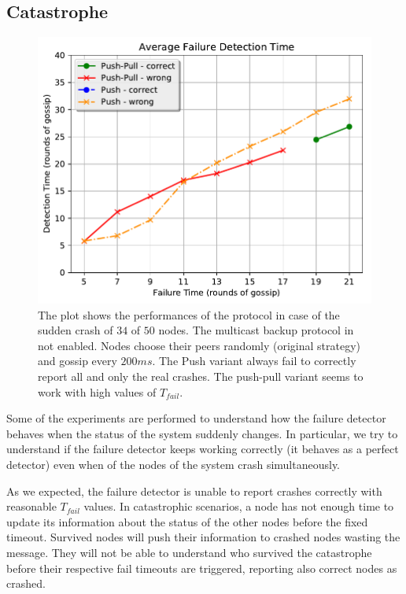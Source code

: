 \subsection*{Catastrophe}

\begin{figure}[t]
	\centering
	\includegraphics[width=\columnwidth]{figures/n50__average__s0__catastrophe__no_multicast}
	\caption{The plot shows the performances of the protocol in case of the sudden crash of $34$ of $50$ nodes. The multicast backup protocol in not enabled. Nodes choose their peers randomly (original strategy) and gossip every $200 \si{ms}$. The Push variant always fail to correctly report all and only the real crashes. The push-pull variant seems to work with high values of $T_{fail}$.}
	\label{fig:n50__average__s0__catastrophe__no_multicast}
\end{figure}

Some of the experiments are performed to understand how the failure detector behaves when the status of the system suddenly changes.
In particular, we try to understand if the failure detector keeps working correctly (it behaves as a perfect detector) even when  of the nodes of the system crash simultaneously. 

As we expected, the failure detector is unable to report crashes correctly with reasonable $T_{fail}$ values.
In catastrophic scenarios, a node has not enough time to update its information about the status of the other nodes before the fixed timeout.
Survived nodes will push their information to crashed nodes wasting the message.
They will not be able to understand who survived the catastrophe before their respective fail timeouts are triggered, reporting also correct nodes as crashed.

